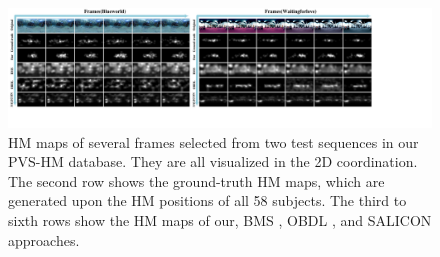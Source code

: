 \documentclass[10pt,journal,compsoc]{IEEEtran}
\begin{document}
\begin{figure}
\vspace{-1em}
	\begin{center}
		\centerline{\includegraphics[width=2\columnwidth]{figures/experiment/objective_result_1}}%
\vspace{-1em}
                  \caption{\footnotesize{HM maps of several frames selected from two test sequences in our PVS-HM database. They are all visualized in the 2D coordination.  The second row shows the ground-truth HM maps, which are generated upon the HM positions of all 58 subjects. The third to sixth rows show the HM maps of our, BMS \cite{zhang2016exploiting} , OBDL \cite{hossein2015many}, and SALICON \cite{huang2015salicon} approaches. }}
		\label{figure-object}
	\end{center}
\end{figure}
\end{document}
